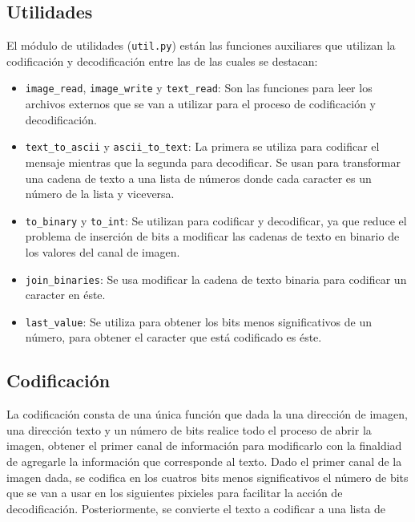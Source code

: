 \documentclass[conference]{IEEEtran}
\begin{document}
	\subsection*{Utilidades}
	El módulo de utilidades (\texttt{util.py}) están las funciones auxiliares que utilizan la codificación y decodificación entre las de las cuales se destacan:
	\begin{itemize}
	    \item \texttt{image\_read}\footnotemark, \texttt{image\_write} y \texttt{text\_read}: Son las funciones para leer los archivos externos que se van a utilizar para el proceso de codificación y decodificación.
         
	    	    
        \item \texttt{text\_to\_ascii} y \texttt{ascii\_to\_text}: La primera se utiliza para codificar el mensaje mientras que la segunda para decodificar. Se usan para transformar una cadena de texto a una lista de números donde cada caracter es un número de la lista y viceversa.
        
        \item \texttt{to\_binary} y \texttt{to\_int}: Se utilizan para codificar y decodificar, ya que reduce el problema de inserción de bits a modificar las cadenas de texto en binario de los valores del canal de imagen.
        
        \item \texttt{join\_binaries}: Se usa modificar la cadena de texto binaria para codificar un caracter en éste.
        
        \item \texttt{last\_value}: Se utiliza para obtener los bits menos significativos de un número, para obtener el caracter que está codificado es éste.
	\end{itemize}
	
    	
	
	\subsection*{Codificación}
        La codificación consta de una única función que dada la una dirección de imagen, una dirección texto y un número de bits realice todo el proceso de abrir la imagen, obtener el primer canal de información para modificarlo con la finaldiad de agregarle la información que corresponde al texto.
        Dado el primer canal de la imagen dada, se codifica en los cuatros bits menos significativos el número de bits que se van a usar en los siguientes pixieles para facilitar la acción de decodificación.
        Posteriormente, se convierte el texto a codificar a una lista de 
        
\end{document}

